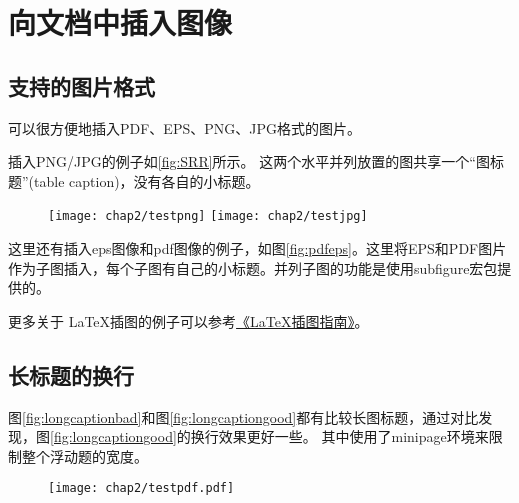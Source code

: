 \section{向文档中插入图像}
\label{sec:insertimage}

\subsection{支持的图片格式}
\label{sec:imageformat}

\XeTeX 可以很方便地插入PDF、EPS、PNG、JPG格式的图片。

插入PNG/JPG的例子如\ref{fig:SRR}所示。
这两个水平并列放置的图共享一个``图标题''(table caption)，没有各自的小标题。

\begin{figure}[!htp]
  \centering
  \texttt{[image: chap2/testpng]}
  \hspace{1cm}
  \texttt{[image: chap2/testjpg]}
\end{figure}

这里还有插入eps图像和pdf图像的例子，如图\ref{fig:pdfeps}。这里将EPS和PDF图片作为子图插入，每个子图有自己的小标题。并列子图的功能是使用subfigure宏包提供的。

\begin{figure}
  \centering
  \hspace{1in}
\end{figure}

更多关于 \LaTeX 插图的例子可以参考\href{http://www.cs.duke.edu/junhu/Graphics3.pdf}{《\LaTeX 插图指南》}。

\subsection{长标题的换行}
\label{sec:longcaption}

图\ref{fig:longcaptionbad}和图\ref{fig:longcaptiongood}都有比较长图标题，通过对比发现，图\ref{fig:longcaptiongood}的换行效果更好一些。
其中使用了minipage环境来限制整个浮动题的宽度。

\begin{figure}[!htp]
 \centering
 \texttt{[image: chap2/testpdf.pdf]}
\end{figure}


